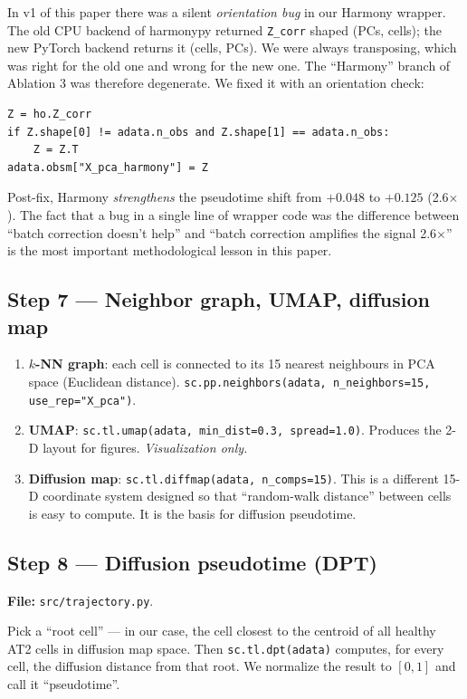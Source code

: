 \documentclass[11pt]{article}
\begin{document}
\begin{pitfall}
In v1 of this paper there was a silent \emph{orientation bug} in our Harmony
wrapper. The old CPU backend of harmonypy returned \texttt{Z\_corr} shaped
(PCs, cells); the new PyTorch backend returns it (cells, PCs). We were
always transposing, which was right for the old one and wrong for the new
one. The ``Harmony'' branch of Ablation 3 was therefore degenerate. We fixed
it with an orientation check:
\begin{verbatim}
Z = ho.Z_corr
if Z.shape[0] != adata.n_obs and Z.shape[1] == adata.n_obs:
    Z = Z.T
adata.obsm["X_pca_harmony"] = Z
\end{verbatim}
Post-fix, Harmony \emph{strengthens} the pseudotime shift from $+0.048$ to
$+0.125$ (2.6$\times$). The fact that a bug in a single line of wrapper
code was the difference between ``batch correction doesn't help'' and
``batch correction amplifies the signal 2.6$\times$'' is the most important
methodological lesson in this paper.
\end{pitfall}

\subsection{Step 7 --- Neighbor graph, UMAP, diffusion map}

\begin{enumerate}
\item \textbf{$k$-NN graph}: each cell is connected to its 15 nearest
      neighbours in PCA space (Euclidean distance).
      \texttt{sc.pp.neighbors(adata, n\_neighbors=15, use\_rep="X\_pca")}.
\item \textbf{UMAP}: \texttt{sc.tl.umap(adata, min\_dist=0.3, spread=1.0)}.
      Produces the 2-D layout for figures. \emph{Visualization only.}
\item \textbf{Diffusion map}: \texttt{sc.tl.diffmap(adata, n\_comps=15)}.
      This is a different 15-D coordinate system designed so that
      ``random-walk distance'' between cells is easy to compute. It is
      the basis for diffusion pseudotime.
\end{enumerate}

\subsection{Step 8 --- Diffusion pseudotime (DPT)}

\textbf{File:} \texttt{src/trajectory.py}.

Pick a ``root cell'' --- in our case, the cell closest to the centroid of
all healthy AT2 cells in diffusion map space. Then
\texttt{sc.tl.dpt(adata)} computes, for every cell, the diffusion distance
from that root. We normalize the result to $[0,1]$ and call it
``pseudotime''.
\end{document}
